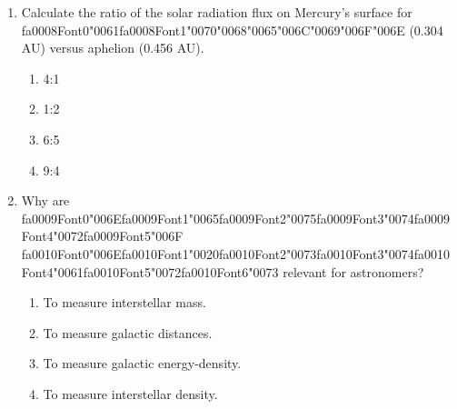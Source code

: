 \documentclass[12pt]{article}
\begin{document}
\begin{enumerate}[label=\arabic*.]
\begin{enumerate}[label=(\alph*)]
    \item 6000 K
    \item 7000 K
    \item 9000 K
    \item 13000 K
\end{enumerate}
\item Calculate the ratio of the solar radiation flux on Mercury's surface for {\csname fa0008Font0\endcsname\char"0061}{\csname fa0008Font1\endcsname\char"0070}{\char"0068}{\char"0065}{\char"006C}{\char"0069}{\char"006F}{\char"006E} (0.304
AU) versus aphelion (0.456 AU).
\begin{enumerate}[label=(\alph*)]
    \item 4:1
    \item 1:2
    \item 6:5
    \item 9:4
\end{enumerate}
\item Why are {\csname fa0009Font0\endcsname\char"006E}{\csname fa0009Font1\endcsname\char"0065}{\csname fa0009Font2\endcsname\char"0075}{\csname fa0009Font3\endcsname\char"0074}{\csname fa0009Font4\endcsname\char"0072}{\csname fa0009Font5\endcsname\char"006F} {\csname fa0010Font0\endcsname\char"006E}{\csname fa0010Font1\endcsname\char"0020}{\csname fa0010Font2\endcsname\char"0073}{\csname fa0010Font3\endcsname\char"0074}{\csname fa0010Font4\endcsname\char"0061}{\csname fa0010Font5\endcsname\char"0072}{\csname fa0010Font6\endcsname\char"0073} relevant for astronomers?
\begin{enumerate}[label=(\alph*)]
    \item To measure interstellar mass.
    \item To measure galactic distances.
    \item To measure galactic energy-density.
    \item To measure interstellar density.
\end{enumerate}
\end{enumerate}
\end{document}

